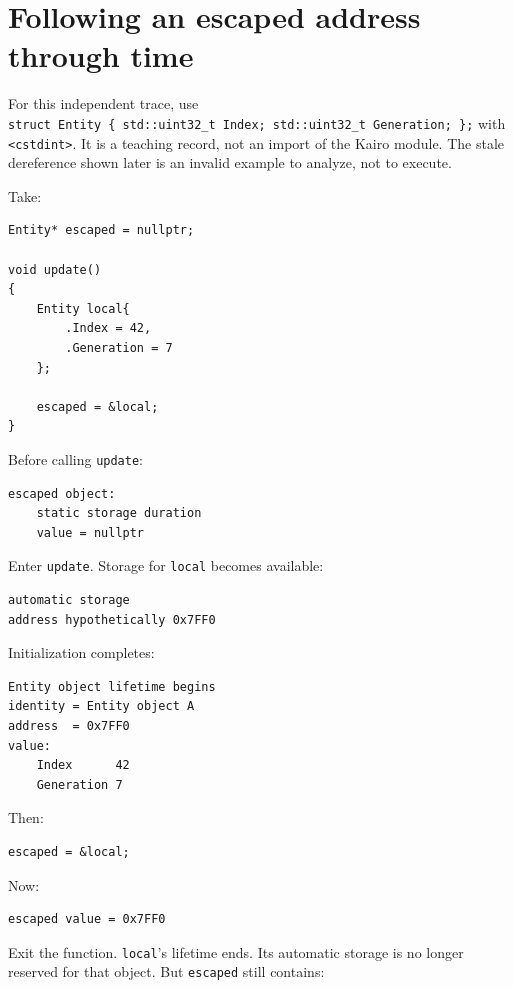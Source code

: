 \section{Following an escaped address through time}\label{01-foundations-i-ch003-following-an-escaped-address-through-time}

\hypertarget{01-foundations-i-ch003-following-an-escaped-address-through-time}{}

For this independent trace, use \texttt{struct\ Entity\ \{\ std::uint32\_t\ Index;\ std::uint32\_t\ Generation;\ \};} with \texttt{\textless{}cstdint\textgreater{}}. It is a teaching record, not an import of the Kairo module. The stale dereference shown later is an invalid example to analyze, not to execute.

Take:

\begin{verbatim}
Entity* escaped = nullptr;

void update()
{
    Entity local{
        .Index = 42,
        .Generation = 7
    };

    escaped = &local;
}
\end{verbatim}

Before calling \texttt{update}:

\begin{verbatim}
escaped object:
    static storage duration
    value = nullptr
\end{verbatim}

Enter \texttt{update}. Storage for \texttt{local} becomes available:

\begin{verbatim}
automatic storage
address hypothetically 0x7FF0
\end{verbatim}

Initialization completes:

\begin{verbatim}
Entity object lifetime begins
identity = Entity object A
address  = 0x7FF0
value:
    Index      42
    Generation 7
\end{verbatim}

Then:

\begin{verbatim}
escaped = &local;
\end{verbatim}

Now:

\begin{verbatim}
escaped value = 0x7FF0
\end{verbatim}

Exit the function. \texttt{local}'s lifetime ends. Its automatic storage is no longer reserved for that object. But \texttt{escaped} still contains:

